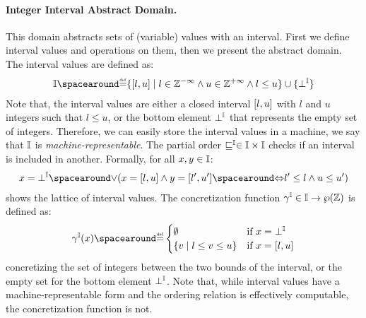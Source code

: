\paragraph{Integer Interval Abstract Domain.}
This domain abstracts sets of (variable) values with an interval.
First we define interval values and operations on them, then we present the abstract domain. The interval values are defined as:
  \begin{align*}
    \intervaltype \DefeQ \setdef{\interval{l}{u}}{l \in \Zminus \land u \in \Zplus \land l \le u} \setjoin \{\intervalbottom\}
  \end{align*}
Note that, the interval values are either a closed interval $[l, u]$ with $l$ and $u$ integers such that $l \le u$, or the bottom element $\bot^{\mathbb{I}}$ that represents the empty set of integers. Therefore, we can easily store the interval values in a machine, we say that $\mathbb{I}$ is \emph{machine-representable}.
The partial order $\sqsubseteq^{\mathbb{I}}\in\mathbb{I}\times\mathbb{I}$ checks if an interval is included in another. Formally, for all $x, y \in \mathbb{I}$:
  \begin{align*}
    x = \intervalbottom \LoR (x = \interval{l}{u} \land y = \interval{l'}{u'} \IfF l' \le l \land u \le u')
  \end{align*}
   shows the lattice of interval values.
  The concretization function $\gamma^{\mathbb{I}}\in\mathbb{I}\to\wp(\mathbb{Z})$ is defined as:
  \begin{align*}
    \intervalconcretization(x) \DefeQ \begin{cases}
      \emptyset & \text{if } x = \intervalbottom \\
      \setdef{v}{l \le v \le u} & \text{if } x = \interval{l}{u}
    \end{cases}
  \end{align*}
  concretizing the set of integers between the two bounds of the interval, or the empty set for the bottom element $\bot^{\mathbb{I}}$.
  Note that, while interval values have a machine-representable form and the ordering relation is effectively computable, the concretization function is not.
%
